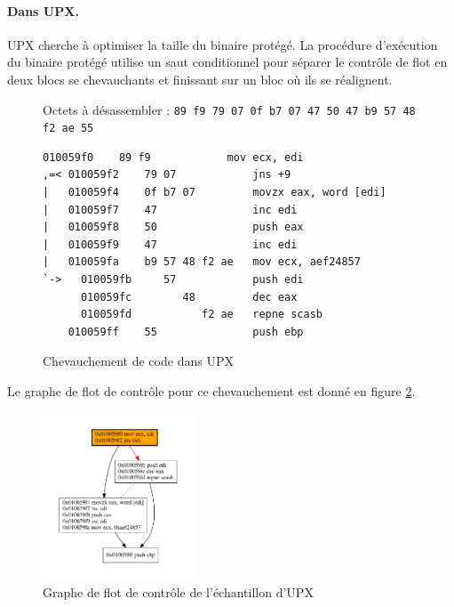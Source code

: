 \paragraph{Dans UPX.}
UPX \cite{UPX} cherche à optimiser la taille du binaire protégé.
La procédure d'exécution du binaire protégé utilise un saut conditionnel pour séparer le contrôle de flot en deux blocs se chevauchants et finissant sur un bloc où ils se réalignent.
\begin{figure}
Octets à désassembler : \texttt{89 f9 79 07 0f b7 07 47 50 47 b9 57 48 f2 ae 55}
\begin{lstlisting}[language={[x86masm]Assembler}, escapechar=~]
    010059f0    89 f9            mov ecx, edi
,=< 010059f2    79 07            jns +9
|   010059f4    0f b7 07         movzx eax, word [edi]
|   010059f7    47               inc edi
|   010059f8    50               push eax
|   010059f9    47               inc edi
|   010059fa    b9 57 48 f2 ae   mov ecx, aef24857
`->   010059fb     57            push edi
      010059fc        48         dec eax
      010059fd           f2 ae   repne scasb
    010059ff    55               push ebp
\end{lstlisting}
\caption{Chevauchement de code dans UPX\label{fig:upx_obf_disas}}
\end{figure}
Le graphe de flot de contrôle pour ce chevauchement est donné en figure \ref{fig:upx_cfg}.

\begin{figure}
\begin{center}
\includegraphics[width=0.4\textwidth]{supports/disasm/upx/upx.pdf}
\end{center}
\caption{Graphe de flot de contrôle de l'échantillon d'UPX}
\label{fig:upx_cfg}
\end{figure}

\FloatBarrier


